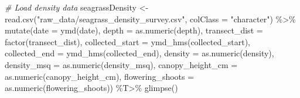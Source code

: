 \documentclass[
]{book}
\newenvironment{Shaded}{\begin{snugshade}}{\end{snugshade}}
\newcommand{\AttributeTok}[1]{\textcolor[rgb]{0.77,0.63,0.00}{#1}}
\newcommand{\CommentTok}[1]{\textcolor[rgb]{0.56,0.35,0.01}{\textit{#1}}}
\newcommand{\FunctionTok}[1]{\textcolor[rgb]{0.00,0.00,0.00}{#1}}
\newcommand{\NormalTok}[1]{#1}
\newcommand{\OtherTok}[1]{\textcolor[rgb]{0.56,0.35,0.01}{#1}}
\newcommand{\SpecialCharTok}[1]{\textcolor[rgb]{0.00,0.00,0.00}{#1}}
\newcommand{\StringTok}[1]{\textcolor[rgb]{0.31,0.60,0.02}{#1}}
\begin{document}
\begin{Shaded}
\begin{Highlighting}[]
\CommentTok{\# Load density data}
\NormalTok{seagrassDensity }\OtherTok{\textless{}{-}} 
  \FunctionTok{read.csv}\NormalTok{(}\StringTok{"raw\_data/seagrass\_density\_survey.csv"}\NormalTok{,}
           \AttributeTok{colClass =} \StringTok{"character"}\NormalTok{) }\SpecialCharTok{\%\textgreater{}\%}
  \FunctionTok{mutate}\NormalTok{(}\AttributeTok{date             =} \FunctionTok{ymd}\NormalTok{(date),}
         \AttributeTok{depth            =} \FunctionTok{as.numeric}\NormalTok{(depth),}
         \AttributeTok{transect\_dist    =} \FunctionTok{factor}\NormalTok{(transect\_dist),}
         \AttributeTok{collected\_start  =} \FunctionTok{ymd\_hms}\NormalTok{(collected\_start),}
         \AttributeTok{collected\_end    =} \FunctionTok{ymd\_hms}\NormalTok{(collected\_end),}
         \AttributeTok{density          =} \FunctionTok{as.numeric}\NormalTok{(density),}
         \AttributeTok{density\_msq      =} \FunctionTok{as.numeric}\NormalTok{(density\_msq),}
         \AttributeTok{canopy\_height\_cm =} \FunctionTok{as.numeric}\NormalTok{(canopy\_height\_cm),}
         \AttributeTok{flowering\_shoots =} \FunctionTok{as.numeric}\NormalTok{(flowering\_shoots)) }\SpecialCharTok{\%T\textgreater{}\%}
  \FunctionTok{glimpse}\NormalTok{()}
\end{Highlighting}
\end{Shaded}
\end{document}
